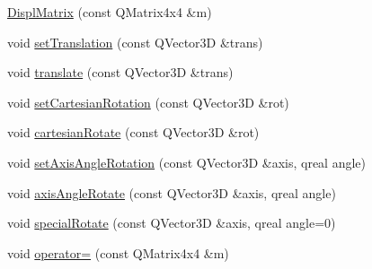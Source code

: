 \begin{DoxyCompactItemize}
\hyperlink{class_robot_model_1_1_displ_matrix_a27c4e90d76c000fdd29632a1a731eeaf}{DisplMatrix} (const QMatrix4x4 \&m)
\item 
void \hyperlink{class_robot_model_1_1_displ_matrix_a7b44ee5a63496a322eb138b6b99da0ae}{setTranslation} (const QVector3D \&trans)
\item 
void \hyperlink{class_robot_model_1_1_displ_matrix_a0c318584b444a3da704d0b4134e10836}{translate} (const QVector3D \&trans)
\item 
void \hyperlink{class_robot_model_1_1_displ_matrix_af04654a74406a7e759ccfc25a443df08}{setCartesianRotation} (const QVector3D \&rot)
\item 
void \hyperlink{class_robot_model_1_1_displ_matrix_a45d0a4b0c897dfef441dedff9aa97866}{cartesianRotate} (const QVector3D \&rot)
\item 
void \hyperlink{class_robot_model_1_1_displ_matrix_a5f4086efc5ae18846c8f9522b8e19f9f}{setAxisAngleRotation} (const QVector3D \&axis, qreal angle)
\item 
void \hyperlink{class_robot_model_1_1_displ_matrix_ad9e25ad14b7c1638be915464ed74772a}{axisAngleRotate} (const QVector3D \&axis, qreal angle)
\item 
void \hyperlink{class_robot_model_1_1_displ_matrix_aca7b61e995cbfc98b4c9be8005877de5}{specialRotate} (const QVector3D \&axis, qreal angle=0)
\item 
void \hyperlink{class_robot_model_1_1_displ_matrix_a3baf235c0c2c7eee46506dc2b2114fe2}{operator=} (const QMatrix4x4 \&m)
\end{DoxyCompactItemize}


